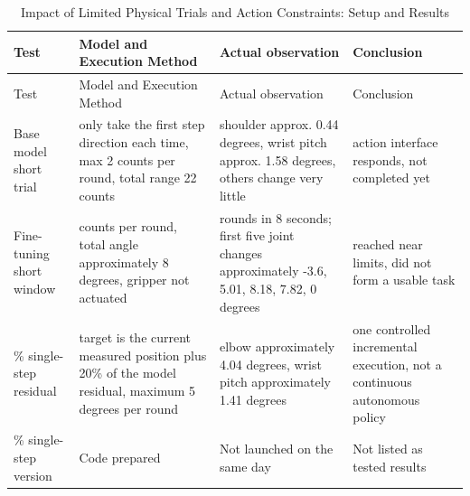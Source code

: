 \FloatBarrier\begingroup\small\setlength{\tabcolsep}{2.5pt}
\begin{longtable}[]{@{}
  >{\raggedright\arraybackslash}p{}
  >{\raggedright\arraybackslash}p{}
  >{\raggedright\arraybackslash}p{}
  >{\raggedright\arraybackslash}p{}@{}}
\caption{Impact of Limited Physical Trials and Action Constraints: Setup and Results}\label{tab:s07-3}\tabularnewline
\toprule\noalign{}
\begin{minipage}[b]{\linewidth}\raggedright
Test
\end{minipage} & \begin{minipage}[b]{\linewidth}\raggedright
Model and Execution Method
\end{minipage} & \begin{minipage}[b]{\linewidth}\raggedright
Actual observation
\end{minipage} & \begin{minipage}[b]{\linewidth}\raggedright
Conclusion
\end{minipage} \\
\midrule\noalign{}
\endfirsthead
\toprule\noalign{}
\begin{minipage}[b]{\linewidth}\raggedright
Test
\end{minipage} & \begin{minipage}[b]{\linewidth}\raggedright
Model and Execution Method
\end{minipage} & \begin{minipage}[b]{\linewidth}\raggedright
Actual observation
\end{minipage} & \begin{minipage}[b]{\linewidth}\raggedright
Conclusion
\end{minipage} \\
\midrule\noalign{}
\endhead
\bottomrule\noalign{}
\endlastfoot
Base model short trial & only take the first step direction each time, max 2 counts per round, total range 22 counts & shoulder approx. 0.44 degrees, wrist pitch approx. 1.58 degrees, others change very little & action interface responds, not completed yet \\
Fine-tuning short window & 4 counts per round, total angle approximately 8 degrees, gripper not actuated & 36 rounds in 8 seconds; first five joint changes approximately -3.6, 5.01, 8.18, 7.82, 0 degrees & reached near limits, did not form a usable task \\
20\% single-step residual & target is the current measured position plus 20\% of the model residual, maximum 5 degrees per round & elbow approximately 4.04 degrees, wrist pitch approximately 1.41 degrees & one controlled incremental execution, not a continuous autonomous policy \\
50\% single-step version & Code prepared & Not launched on the same day & Not listed as tested results \\
\end{longtable}\endgroup

